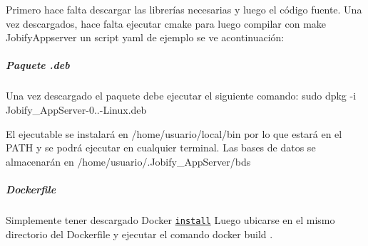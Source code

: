Primero hace falta descargar las librerías necesarias y luego el código fuente. Una vez descargados, hace falta ejecutar {\ttfamily cmake} para luego compilar con {\ttfamily make Jobify\+Appserver} un script {\ttfamily yaml} de ejemplo se ve acontinuación\+: 


\subparagraph*{Paquete {\ttfamily .deb}}

Una vez descargado el paquete debe ejecutar el siguiente comando\+: {\ttfamily sudo dpkg -\/i Jobify\+\_\+\+App\+Server-\/0..-\/\+Linux.\+deb}

El ejecutable se instalará en {\ttfamily /home/usuario/local/bin} por lo que estará en el {\ttfamily P\+A\+TH} y se podrá ejecutar en cualquier terminal. Las bases de datos se almacenarán en {\ttfamily /home/usuario/.Jobify\+\_\+\+App\+Server/bds}

\subparagraph*{Dockerfile}

Simplemente tener descargado Docker \href{https://docs.docker.com/engine/installation/linux/ubuntulinux/}{\tt install} Luego ubicarse en el mismo directorio del {\ttfamily Dockerfile} y ejecutar el comando {\ttfamily docker build .} 
